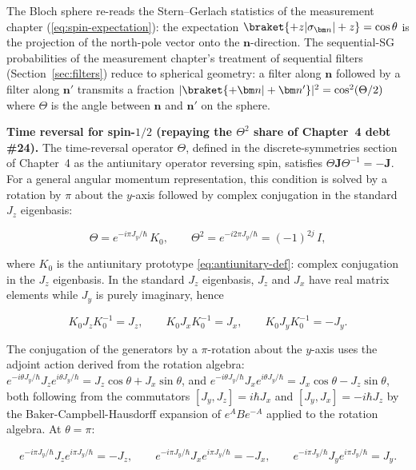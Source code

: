 The Bloch sphere re-reads the Stern--Gerlach statistics of the measurement chapter (\eqref{eq:spin-expectation}): the expectation $\braket{+z|\sigma_{\bm n}|+z} = \cos\theta$ is the projection of the north-pole vector onto the $\bm n$-direction. The sequential-SG probabilities of the measurement chapter's treatment of sequential filters (Section~\ref{sec:filters}) reduce to spherical geometry: a filter along $\bm n$ followed by a filter along $\bm n'$ transmits a fraction $|\braket{+\bm n|+\bm n'}|^2 = \cos^2(\Theta/2)$ where $\Theta$ is the angle between $\bm n$ and $\bm n'$ on the sphere.

\medskip\noindent\textbf{Time reversal for spin-$1/2$ (repaying the $\Theta^2$ share of Chapter~4 debt \#24).}
The time-reversal operator $\Theta$, defined in the discrete-symmetries section of Chapter~4 as the antiunitary operator reversing spin, satisfies $\Theta \bm J \Theta^{-1} = -\bm J$. For a general angular momentum representation, this condition is solved by a rotation by $\pi$ about the $y$-axis followed by complex conjugation in the standard $J_z$ eigenbasis:
\begin{linenomath}
  \begin{equation}
    \Theta = e^{-i\pi J_y/\hbar}\,K_0,
    \qquad
    \Theta^2 = e^{-i2\pi J_y/\hbar} = (-1)^{2j}\,I,
    \label{eq:theta-j}
  \end{equation}
\end{linenomath}
where $K_0$ is the antiunitary prototype \eqref{eq:antiunitary-def}: complex conjugation in the $J_z$ eigenbasis. In the standard $J_z$ eigenbasis, $J_z$ and $J_x$ have real matrix elements while $J_y$ is purely imaginary, hence
\begin{linenomath}
\begin{equation*}
K_0 J_z K_0^{-1} = J_z,\qquad
K_0 J_x K_0^{-1} = J_x,\qquad
K_0 J_y K_0^{-1} = -J_y.
\end{equation*}
\end{linenomath}
The conjugation of the generators by a $\pi$-rotation about the $y$-axis uses the adjoint action derived from the rotation algebra: $e^{-i\theta J_y/\hbar}J_z e^{i\theta J_y/\hbar} = J_z\cos\theta + J_x\sin\theta$, and $e^{-i\theta J_y/\hbar}J_x e^{i\theta J_y/\hbar} = J_x\cos\theta - J_z\sin\theta$, both following from the commutators $[J_y,J_z]=i\hbar J_x$ and $[J_y,J_x]=-i\hbar J_z$ by the Baker-Campbell-Hausdorff expansion of $e^{A}Be^{-A}$ applied to the rotation algebra. At $\theta=\pi$:
\begin{linenomath}
\begin{equation*}
e^{-i\pi J_y/\hbar}J_z e^{i\pi J_y/\hbar} = -J_z,\qquad
e^{-i\pi J_y/\hbar}J_x e^{i\pi J_y/\hbar} = -J_x,\qquad
e^{-i\pi J_y/\hbar}J_y e^{i\pi J_y/\hbar} = J_y.
\end{equation*}
\end{linenomath}
